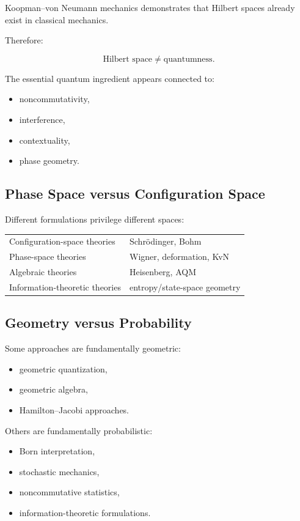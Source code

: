 \documentclass[11pt]{article}
\begin{document}
Koopman--von Neumann mechanics demonstrates that Hilbert spaces already exist in classical mechanics.

Therefore:

\[
\text{Hilbert space}
\neq
\text{quantumness}.
\]

The essential quantum ingredient appears connected to:

\begin{itemize}
\item noncommutativity,
\item interference,
\item contextuality,
\item phase geometry.
\end{itemize}

\subsection{Phase Space versus Configuration Space}

Different formulations privilege different spaces:

\begin{center}
\begin{tabular}{ll}
Configuration-space theories & Schr\"odinger, Bohm \\
Phase-space theories & Wigner, deformation, KvN \\
Algebraic theories & Heisenberg, AQM \\
Information-theoretic theories & entropy/state-space geometry
\end{tabular}
\end{center}

\subsection{Geometry versus Probability}

Some approaches are fundamentally geometric:

\begin{itemize}
\item geometric quantization,
\item geometric algebra,
\item Hamilton--Jacobi approaches.
\end{itemize}

Others are fundamentally probabilistic:

\begin{itemize}
\item Born interpretation,
\item stochastic mechanics,
\item noncommutative statistics,
\item information-theoretic formulations.
\end{itemize}
\end{document}
